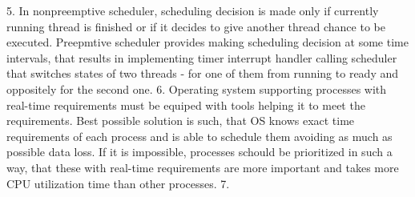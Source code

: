 5.
In nonpreemptive scheduler, scheduling decision is made only if currently running thread is finished or if it decides to give another thread chance to be executed. Preepmtive scheduler provides making scheduling decision at some time intervals, that results in implementing timer interrupt handler calling scheduler that switches states of two threads - for one of them from running to ready and oppositely for the second one.
6.
Operating system supporting processes with real-time requirements must be equiped with tools helping it to meet the requirements. Best possible solution is such, that OS knows exact time requirements of each process and is able to schedule them avoiding as much as possible data loss. If it is impossible, processes schould be prioritized in such a way, that these with real-time requirements are more important and takes more CPU utilization time than other processes.
7.


